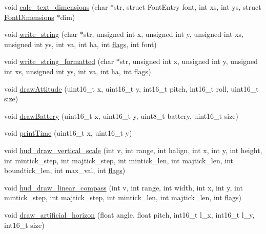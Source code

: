 \begin{DoxyCompactItemize}
\item 
void \hyperlink{group___o_s_d_g_e_n_module_gaeb262588efc72fef0d981fb2c7e447d4}{calc\-\_\-text\-\_\-dimensions} (char $\ast$str, struct \-Font\-Entry font, int xs, int ys, struct \hyperlink{struct_font_dimensions}{\-Font\-Dimensions} $\ast$dim)
\item 
void \hyperlink{group___o_s_d_g_e_n_module_ga9202b1bd055f9fa88d46cec7ed412763}{write\-\_\-string} (char $\ast$str, unsigned int x, unsigned int y, unsigned int xs, unsigned int ys, int va, int ha, int \hyperlink{uavobjectmanager_8c_a89997860157be94711355010fc2a337d}{flags}, int font)
\item 
void \hyperlink{group___o_s_d_g_e_n_module_gab49221eead66b5e8af2b4e3104fa8456}{write\-\_\-string\-\_\-formatted} (char $\ast$str, unsigned int x, unsigned int y, unsigned int xs, unsigned int ys, int va, int ha, int \hyperlink{uavobjectmanager_8c_a89997860157be94711355010fc2a337d}{flags})
\item 
void \hyperlink{group___o_s_d_g_e_n_module_gab6cd6692726c21ca6a7da8b8acf01de3}{draw\-Attitude} (uint16\-\_\-t x, uint16\-\_\-t y, int16\-\_\-t pitch, int16\-\_\-t roll, uint16\-\_\-t size)
\item 
void \hyperlink{group___o_s_d_g_e_n_module_ga85d7e1ad745a9c81483f8b513db8cebc}{draw\-Battery} (uint16\-\_\-t x, uint16\-\_\-t y, uint8\-\_\-t battery, uint16\-\_\-t size)
\item 
void \hyperlink{group___o_s_d_g_e_n_module_ga8b0f8e99f2bfee4a902a9d46a8714579}{print\-Time} (uint16\-\_\-t x, uint16\-\_\-t y)
\item 
void \hyperlink{group___o_s_d_g_e_n_module_ga03d95a090f293be5c864ee5334d3c287}{hud\-\_\-draw\-\_\-vertical\-\_\-scale} (int v, int range, int halign, int x, int y, int height, int mintick\-\_\-step, int majtick\-\_\-step, int mintick\-\_\-len, int majtick\-\_\-len, int boundtick\-\_\-len, int max\-\_\-val, int \hyperlink{uavobjectmanager_8c_a89997860157be94711355010fc2a337d}{flags})
\item 
void \hyperlink{group___o_s_d_g_e_n_module_ga1598b1881ca23bff8a3df4c896ed4869}{hud\-\_\-draw\-\_\-linear\-\_\-compass} (int v, int range, int width, int x, int y, int mintick\-\_\-step, int majtick\-\_\-step, int mintick\-\_\-len, int majtick\-\_\-len, int \hyperlink{uavobjectmanager_8c_a89997860157be94711355010fc2a337d}{flags})
\item 
void \hyperlink{group___o_s_d_g_e_n_module_gab0e4e7223434b0cf8dd683461136fcd2}{draw\-\_\-artificial\-\_\-horizon} (float angle, float pitch, int16\-\_\-t l\-\_\-x, int16\-\_\-t l\-\_\-y, int16\-\_\-t size)

\end{DoxyCompactItemize}
